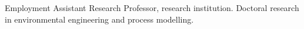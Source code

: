 \begin{rubric}{Employment}
\entry*[2024--present] Assistant Research Professor, research institution.
\entry*[2020--2024] Doctoral research in environmental engineering and process modelling.
\end{rubric}
